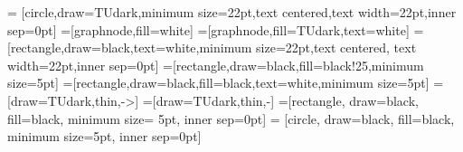 \makeatletter
\newcommand*{\centernot}{%
  \mathpalette\@centernot
}
\def\@centernot#1#2{%
  \mathrel{%
    \rlap{%
      \settowidth\dimen@{$\m@th#1{#2}$}%
      \kern.5\dimen@
      \settowidth\dimen@{$\m@th#1=$}%
      \kern-.5\dimen@
      $\m@th#1\not$%
    }%
    {#2}%
  }%
}
\makeatother

\newcommand{\independent}{\perp\mkern-9.5mu\perp}
\newcommand{\notindependent}{\centernot{\independent}}

\newcommand{\q}{\quad}
\newcommand{\qq}{\qquad}
\newcommand{\qqq}{\quad\qquad}
\newcommand{\qqqq}{\qquad\qquad}

\usepackage[e]{esvect} %

\renewcommand{\vec}{\boldsymbol} 
\newcommand{\fun}[1]{\mathsf{#1}}
\newcommand{\vect}[1]{\vv{#1}}
\renewcommand{\O}{\mathcal{O}}
\newcommand{\Id}{I} 
\newcommand{\II}{\mathbb{I}}

\makeatletter
\newcommand{\superimpose}[2]{%
  {\ooalign{$#1\@firstoftwo#2$\cr\hfil$#1\@secondoftwo#2$\hfil\cr}}}
\makeatother
\newcommand{\ostimes}{\mathpalette\superimpose{{\otimes}{\ominus}}}
\newcommand{\oatimes}{\mathpalette\superimpose{{\otimes}{\obar}}}

\DeclareMathOperator*{\sumint}{\mathpalette\superimpose{{\int}{\sum}}}

\newcommand{\bX}{\mathbb{X}}
\newcommand{\const}{\mathrm{const.}}

\newcommand{\up}{\textasciicircum}


\usetikzlibrary{arrows,shapes,plotmarks,decorations.pathmorphing}
\usetikzlibrary{backgrounds,calc,positioning,fadings}

\tikzset{>=stealth'} 
 = 
   [circle,draw=TUdark,minimum size=22pt,text centered,text
     width=22pt,inner sep=0pt] 
   =[graphnode,fill=white]
   =[graphnode,fill=TUdark,text=white]
   =[rectangle,draw=black,text=white,minimum
size=22pt,text centered, text width=22pt,inner sep=0pt]
   =[rectangle,draw=black,fill=black!25,minimum size=5pt]
 =[rectangle,draw=black,fill=black,text=white,minimum size=5pt]
  =[draw=TUdark,thin,->]
  =[draw=TUdark,thin,-]
 =[rectangle, draw=black, fill=black, minimum size=
5pt, inner sep=0pt]
 = [circle, draw=black, fill=black, minimum
size=5pt, inner sep=0pt]

